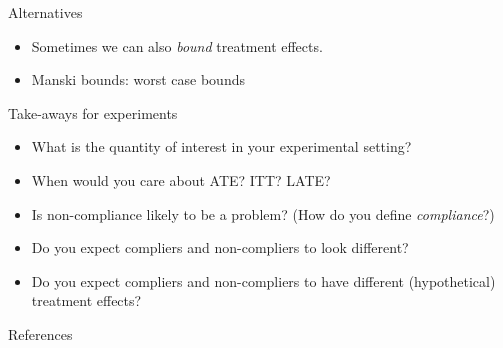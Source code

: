 \documentclass[xcolor={dvipsnames},handout]{beamer}
\begin{document}
\begin{frame}{Alternatives}

\begin{itemize}
\item Sometimes we can also \textit{bound} treatment effects.
\item Manski bounds: worst case bounds
\end{itemize}

\end{frame}



\begin{frame}{Take-aways for experiments}

\begin{itemize}
\item What is the quantity of interest in your experimental setting?
\item When would you care about ATE? ITT? LATE?
\item Is non-compliance likely to be a problem?  (How do you define \textit{compliance}?)
\item Do you expect compliers and non-compliers to look different?
\item Do you expect compliers and non-compliers to have different (hypothetical) treatment effects?
\end{itemize}

\end{frame}





\backupbegin

\begin{frame}[allowframebreaks]{References}
    
    
\end{frame}
\backupend
\end{document}
